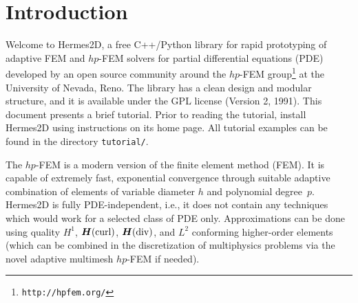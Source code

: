 \documentclass[11pt]{article}
\newcommand{\bfH}{\mbox{\boldmath $H$}}
\def\Hcurl{{\bfH({\rm curl})}}
\def\Hdiv{{\bfH({\rm div})}}
\begin{document}


\setcounter{page}{1}
\pagestyle{plain}
\renewcommand{\thepage}{\roman{page}}
\tableofcontents
\newpage
\setcounter{page}{1}
\renewcommand{\thepage}{\arabic{page}}


\section{Introduction}
\label{ch:intro}

Welcome to Hermes2D, a free C++/Python library for rapid prototyping of adaptive FEM
and $hp$-FEM solvers for partial differential equations (PDE)
developed by an open source community around the $hp$-FEM group\footnote{\tt http://hpfem.org/}
at the University of Nevada, Reno. The library has a clean design and modular structure,
and it is available under the GPL license (Version 2, 1991). This document presents
a brief tutorial. Prior to reading the tutorial, install Hermes2D using instructions
on its home page. All tutorial examples can be found in the directory {\tt tutorial/}.

The $hp$-FEM is a modern version of the finite element method (FEM). It is capable of
extremely fast, exponential convergence through suitable adaptive combination of
elements of variable diameter $h$ and polynomial degree~$p$. Hermes2D is fully PDE-independent,
i.e., it does not contain any techniques which would work for a selected class of PDE only.
Approximations can be done using quality $H^1$, $\Hcurl$, $\Hdiv$, and $L^2$ conforming
higher-order elements (which can be combined in the discretization of multiphysics
problems via the novel adaptive multimesh $hp$-FEM if needed).
\end{document}
